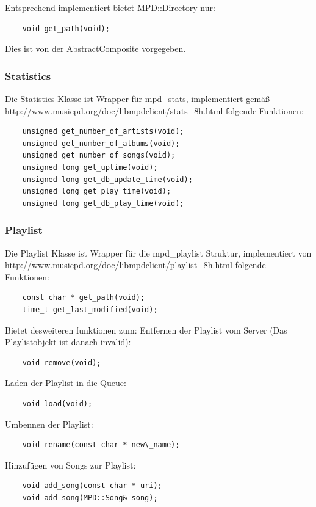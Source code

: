Entsprechend implementiert bietet MPD::Directory nur:
\begin{verbatim}
    void get_path(void);
\end{verbatim}

Dies ist von der AbstractComposite vorgegeben.

\newpage
\subsubsection{Statistics}
Die Statistics Klasse ist Wrapper für mpd\_stats, implementiert gemäß
\\http://www.musicpd.org/doc/libmpdclient/stats\_8h.html
folgende Funktionen:
\begin{verbatim}
    unsigned get_number_of_artists(void);
    unsigned get_number_of_albums(void);
    unsigned get_number_of_songs(void);
    unsigned long get_uptime(void);
    unsigned long get_db_update_time(void);
    unsigned long get_play_time(void);
    unsigned long get_db_play_time(void);
\end{verbatim}


\subsubsection{Playlist}
Die Playlist Klasse ist Wrapper für die mpd\_playlist Struktur, implementiert von http://www.musicpd.org/doc/libmpdclient/playlist\_8h.html folgende Funktionen:
\begin{verbatim}
    const char * get_path(void);
    time_t get_last_modified(void);
\end{verbatim}

Bietet desweiteren funktionen zum:
Entfernen der Playlist vom Server (Das Playlistobjekt ist danach invalid):
\begin{verbatim}
    void remove(void);
\end{verbatim}

Laden der Playlist in die Queue:
\begin{verbatim}
    void load(void);
\end{verbatim}

Umbennen der Playlist:
\begin{verbatim}
    void rename(const char * new\_name);
\end{verbatim}

Hinzufügen von Songs zur Playlist:
\begin{verbatim}
    void add_song(const char * uri);
    void add_song(MPD::Song& song);
\end{verbatim}


